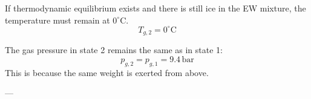 If thermodynamic equilibrium exists and there is still ice in the EW mixture, the temperature must remain at \( 0^\circ \text{C} \).  
\[
T_{g,2} = 0^\circ \text{C}
\]  

The gas pressure in state 2 remains the same as in state 1:  
\[
p_{g,2} = p_{g,1} = 9.4 \, \text{bar}
\]  
This is because the same weight is exerted from above.

---